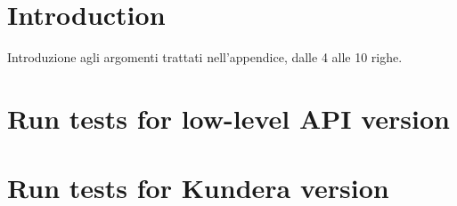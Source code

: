 \section{Introduction}
Introduzione agli argomenti trattati nell'appendice, dalle 4 alle 10 righe.

\section{Run tests for low-level API version}
\label{appendix:ycsb-low-level}

\section{Run tests for Kundera version}
\label{appendix:ycsb-kundera}
